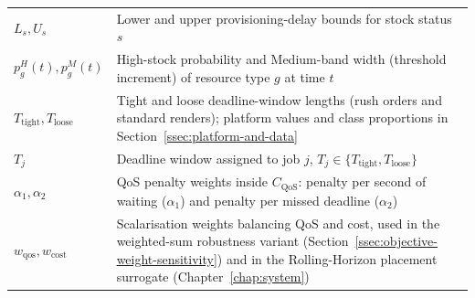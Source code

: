\begin{table}[htbp]
\begin{singlespace}
\begin{tabular}{lp{9cm}}
$L_s, U_s$ & Lower and upper provisioning-delay bounds for stock status $s$ \\
$p^{H}_g(t), p^{M}_g(t)$ & High-stock probability and Medium-band width (threshold increment) of resource type $g$ at time $t$ \\
$T_{\text{tight}},T_{\text{loose}}$ & Tight and loose deadline-window lengths (rush orders and standard renders); platform values and class proportions in Section~\ref{ssec:platform-and-data} \\
$T_j$ & Deadline window assigned to job $j$, $T_j \in \{T_{\text{tight}}, T_{\text{loose}}\}$ \\
$\alpha_1, \alpha_2$ & QoS penalty weights inside $C_{\text{QoS}}$: penalty per second of waiting ($\alpha_1$) and penalty per missed deadline ($\alpha_2$) \\
$w_{\text{qos}}, w_{\text{cost}}$ & Scalarisation weights balancing QoS and cost, used in the weighted-sum robustness variant (Section~\ref{ssec:objective-weight-sensitivity}) and in the Rolling-Horizon placement surrogate (Chapter~\ref{chap:system}) \\
\bottomrule
\end{tabular}
\end{singlespace}
\end{table}

